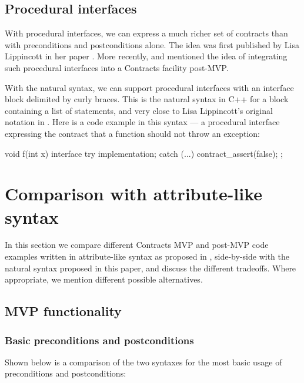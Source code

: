 \subsection{Procedural interfaces}
\label{subsec:interfaces}

With procedural interfaces, we can express a much richer set of contracts than with preconditions and postconditions alone. The idea was first published by Lisa Lippincott in her paper \cite{P0465R0}. More recently, \cite{P2885R3} and \cite{P2935R3} mentioned the idea of integrating such procedural interfaces into a Contracts facility post-MVP.

With the natural syntax, we can support procedural interfaces with an interface block delimited by curly braces. This is the natural syntax in C++ for a block containing a list of statements, and very close to Lisa Lippincott's original notation in \cite{P0465R0}. Here is a code example in this syntax --- a procedural interface expressing the contract that a function should not throw an exception:

\begin{codeblock}
void f(int x)
interface {
  try {
    implementation;
  } 
  catch (...) {
    contract_assert(false);
  }
};
\end{codeblock}


\section{Comparison with attribute-like syntax}

In this section we compare different Contracts MVP and post-MVP code examples written in attribute-like syntax as proposed in \cite{P2935R3}, side-by-side with the natural syntax proposed in this paper, and discuss the different tradeoffs. Where appropriate, we mention different possible alternatives.

\subsection{MVP functionality}

\subsubsection{Basic preconditions and postconditions}
Shown below is a comparison of the two syntaxes for the most basic usage of preconditions and postconditions:

